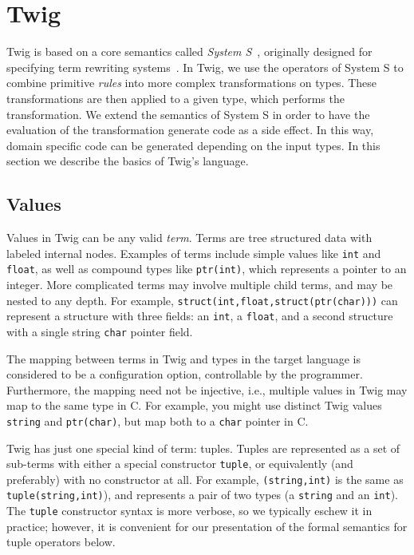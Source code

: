 
\section{Twig}
\label{sec:semantics}

Twig is based on a core semantics called \emph{System S}~\cite{system-s}, originally designed for specifying term rewriting systems~\cite{baader98rewriting}. In Twig, we use the operators of System S to combine primitive \emph{rules} into more complex transformations on types. These transformations are then applied to a given type, which performs the transformation. We extend the semantics of System S in order to have the evaluation of the transformation generate code as a side effect. In this way, domain specific code can be generated depending on the input types. In this section we describe the basics of Twig's language.

\subsection{Values}

Values in Twig can be any valid \emph{term}. Terms are tree structured data with labeled internal nodes. Examples of terms include simple values like \texttt{int} and \texttt{float}, as well as compound types like \texttt{ptr(int)}, which represents a pointer to an integer. More complicated terms may involve multiple child terms, and may be nested to any depth. For example, \texttt{struct(int,float,struct(ptr(char)))} can represent a structure with three fields: an \texttt{int}, a \texttt{float}, and a second structure with a single string \texttt{char} pointer field.

The mapping between terms in Twig and types in the target language is considered to be a configuration option, controllable by the programmer. Furthermore, the mapping need not be injective, i.e., multiple values in Twig may map to the same type in C. For example, you might use distinct Twig values \texttt{string} and \texttt{ptr(char)}, but map both to a \texttt{char} pointer in C.

Twig has just one special kind of term: tuples. Tuples are represented as a set of sub-terms with either a special constructor \texttt{tuple}, or equivalently (and preferably) with no constructor at all. For example, \texttt{(string,int)} is the same as \texttt{tuple(string,int)}), and represents a pair of two types (a \texttt{string} and an \texttt{int}). The \texttt{tuple} constructor syntax is more verbose, so we typically eschew it in practice; however, it is convenient for our presentation of the formal semantics for tuple operators below.

